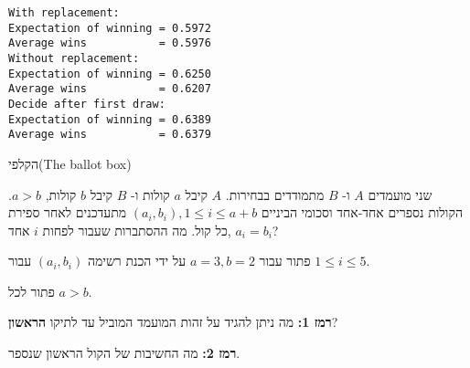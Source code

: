\sml{}

\begin{verbatim}
With replacement:
Expectation of winning = 0.5972
Average wins           = 0.5976
Without replacement:
Expectation of winning = 0.6250
Average wins           = 0.6207
Decide after first draw:
Expectation of winning = 0.6389
Average wins           = 0.6379
\end{verbatim}


\newpage

\begin{prob}{הקלפי}{}{(The ballot box)}

שני מועמדים
$A$
ו-%
$B$
מתמודדים בבחירות. 
$A$
קיבל
$a$
קולות ו-%
$B$
קיבל
$b$
קולות,
$a>b$.
הקולות נספרים אחד-אחד וסכומי הביניים
$(a_i,b_i), 1\leq i \leq a+b$
מתעדכנים לאחר ספירת כל קול. מה ההסתברות שעבור לפחות
$i$
אחד,
$a_i=b_i$?

פתור עבור
$a=3, b=2$
על ידי הכנת רשימה
$(a_i,b_i)$
עבור
$1\leq i\leq 5$.

פתור לכל
$a>b$.

\textbf{רמז 1:} 
מה ניתן להגיד על זהות המועמד המוביל עד לתיקו 
\textbf{הראשון}?

\textbf{רמז 2:}
מה החשיבות של הקול הראשון שנספר.
\end{prob}

\solution{}

